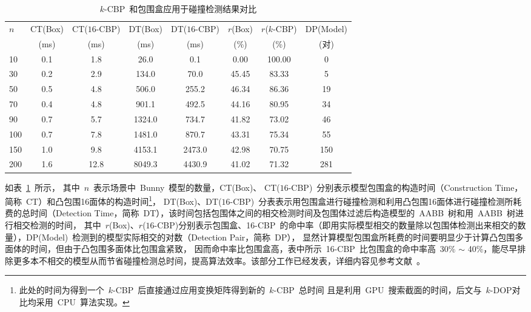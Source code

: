 \begin{table}[htbp]
\caption{$k$-CBP~和包围盒应用于碰撞检测结果对比}
\label{tab:exp:box:kcbp:collsiondetection}
\centering
\begin{tabular}{lccccccc}
 \toprule[1.5pt]
 \multirow{2}{*}{$n$} & CT(Box) & CT($16$-CBP) & DT(Box) & DT($16$-CBP) & $r$(Box) & $r$($k$-CBP) & DP(Model)\\ %
                      & (ms)    & (ms)          & (ms)  & (ms)          & (\%)      & (\%)  & (对)  \\
  \midrule[1.0pt]
   10 & 0.1 & 1.8 &    26.0  & 0.1    & 0.00  & 100.00 & 0\\
   30 & 0.2 & 2.9 &   134.0  & 70.0   & 45.45 & 83.33 & 5\\
   50 & 0.5 & 4.8 &   506.0  & 255.2  & 46.34 & 86.36 & 19 \\
   70 & 0.4 & 4.8 &   901.1  & 492.5  & 44.16 & 80.95 & 34 \\
   90 & 0.7 & 5.7 &  1324.0  & 734.7  & 41.82 & 73.02 & 46 \\
  100 & 0.7 & 7.8 &  1481.0  & 870.7  & 43.31 & 75.34 & 55 \\
  150 & 1.0 & 9.8 &  4153.1  & 2473.0 & 42.98 & 70.75 & 150 \\
  200 & 1.6 & 12.8 & 8049.3  & 4430.9 & 41.02 & 71.32 & 281 \\
  \bottomrule[1.5pt]
 \end{tabular}
\end{table}

如表~\ref{tab:exp:box:kcbp:collsiondetection}~所示，
其中~$n$~表示场景中~Bunny~模型的数量，CT(Box)、 CT($16$-CBP)~分别表示模型包围盒的构造时间（Construction Time，简称~CT）和凸包围16面体的构造时间\footnote{此处的时间为得到一个~$k$-CBP~后直接通过应用变换矩阵得到新的~$k$-CBP~总时间
且是利用~GPU~搜索截面的时间，后文与~$k$-DOP对比均采用~CPU~算法实现。}， DT(Box)、DT($16$-CBP)~分表表示用包围盒进行碰撞检测和利用凸包围16面体进行碰撞检测所耗费的总时间（Detection Time，简称~DT），该时间包括包围体之间的相交检测时间及包围体过滤后构造模型的~AABB~树和用~AABB~树进行相交检测的时间，
其中~$r$(Box)、$r$($16$-CBP)分别表示包围盒、16-CBP~的命中率（即用实际模型相交的数量除以包围体检测出来相交的数量），DP(Model)~检测到的模型实际相交的对数（Detection Pair，简称~DP），
显然计算模型包围盒所耗费的时间要明显少于计算凸包围多面体的时间，但由于凸包围多面体比包围盒紧致，
因而命中率比包围盒高，表中所示~16-CBP~比包围盒的命中率高~30\% $\sim$ 40\%，能尽早排除更多本不相交的模型从而节省碰撞检测总时间，提高算法效率。该部分工作已经发表，详细内容见参考文献~。

